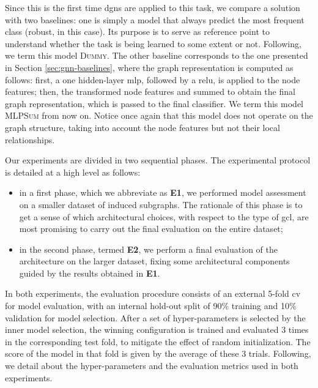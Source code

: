 Since this is the first time \glspl{dgn} are applied to this task, we compare a solution with two baselines: one is simply a  model that always predict the most frequent class (robust, in this case). Its purpose is to serve as reference point to understand whether the task is being learned to some extent or not. Following, we term this model \textsc{Dummy}. The other baseline corresponds to the one presented in Section \ref{sec:gnn-baselines}, where the graph representation is computed as follows: first, a one hidden-layer \gls{mlp}, followed by a \gls{relu}, is applied to the node features; then, the transformed node features and summed to obtain the final graph representation, which is passed to the final classifier. We term this model \textsc{MLPSum} from now on. Notice once again that this model does not operate on the graph structure, taking into account the node features but not their local relationships.

Our experiments are divided in two sequential phases. The experimental protocol is detailed at a high level as follows:
\begin{itemize}
    \item in a first phase, which we abbreviate as \textbf{E1}, we performed model assessment on a smaller dataset of induced subgraphs. The rationale of this phase is to get a sense of which architectural choices, \eg with respect to the type of \gls{gcl}, are most promising to carry out the final evaluation on the entire dataset;
    \item in the second phase, termed \textbf{E2}, we perform a final evaluation of the architecture on the larger dataset, fixing some architectural components guided by the results obtained in \textbf{E1}.
\end{itemize}
In both experiments, the evaluation procedure consists of an external 5-fold \gls{cv} for model evaluation, with an internal hold-out split of 90\% training and 10\% validation for model selection. After a set of hyper-parameters is selected by the inner model selection, the winning configuration is trained and evaluated 3 times in the corresponding test fold, to mitigate the effect of random initialization. The score of the model in that fold is given by the average of these 3 trials. Following, we detail about the hyper-parameters and the evaluation metrics used in both experiments.

